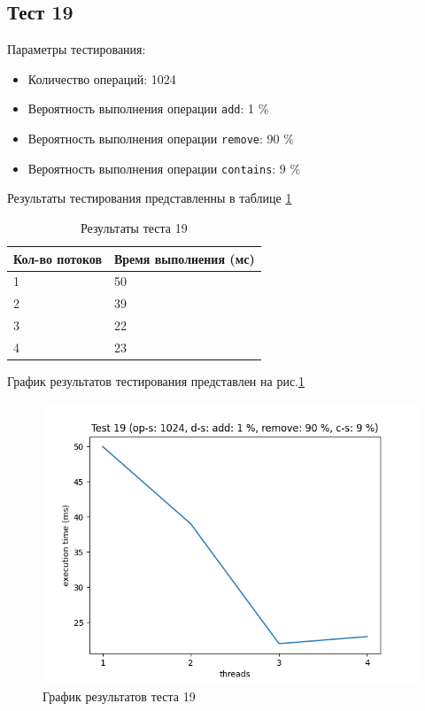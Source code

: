 \subsection*{Тест 19}

Параметры тестирования:

\begin{itemize}
    \item Количество операций: 1024
    \item Вероятность выполнения операции \verb|add|: 1 \%
    \item Вероятность выполнения операции \verb|remove|: 90 \%
    \item Вероятность выполнения операции \verb|contains|: 9 \%
\end{itemize}

Результаты тестирования представленны в таблице \ref{tab:results19}


\begin{table}[H]
    \centering
    \begin{tabular}{|l|l|}
        \hline
        Кол-во потоков & Время выполнения (мс) \\
        \hline
        1 & 50 \\
        \hline
        2 & 39 \\
        \hline
        3 & 22 \\
        \hline
        4 & 23 \\
        \hline
    \end{tabular}
    \caption{Результаты теста 19}
    \label{tab:results19}
\end{table}
        

График результатов тестирования представлен на рис.\ref{fig:plot19}

\begin{figure}[H]
    \centering
    \includegraphics[width=0.7\linewidth]{photo/plot19}
    \caption{График результатов теста 19}
    \label{fig:plot19}
\end{figure}

